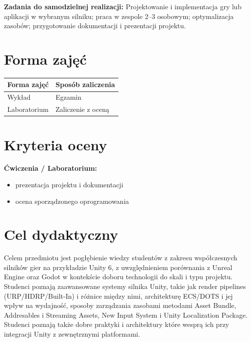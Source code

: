 \documentclass[12pt, a4paper]{article}
\newcommand{\thdrule}{\noalign{\global\setlength{\extrarowheight}{0pt}}}
\newcommand{\thdend}{\noalign{\global\setlength{\extrarowheight}{3pt}}}
\begin{document}
\vspace{4pt}
\noindent\textbf{Zadania do samodzielnej realizacji:} Projektowanie i implementacja gry lub aplikacji w wybranym silniku; praca w zespole 2–3 osobowym; optymalizacja zasobów; przygotowanie dokumentacji i prezentacji projektu.

\section{Forma zajęć}

\begin{center}
{\scriptsize
\begin{tabular}{m{5cm}m{8cm}}
\thdrule\toprule
\rowcolor{pjatkRed} {\color{white}\textbf{Forma zajęć}} & {\color{white}\textbf{Sposób zaliczenia}} \\
\midrule\thdend
  \rowcolor{tableRowLight} Wykład & Egzamin \\
  \rowcolor{tableRowAlt} Laboratorium & Zaliczenie z oceną \\
\bottomrule
\end{tabular}}
\end{center}

\section{Kryteria oceny}

\textbf{Ćwiczenia / Laboratorium:}
\begin{itemize}
  \item prezentacja projektu i dokumentacji
  \item ocena sporządzonego oprogramowania
\end{itemize}


\section{Cel dydaktyczny}

Celem przedmiotu jest pogłębienie wiedzy studentów z zakresu współczesnych silników gier na przykładzie Unity 6, z uwzględnieniem porównania z Unreal Engine oraz Godot w kontekście doboru technologii do skali i typu projektu. Studenci poznają zaawansowane systemy silnika Unity, takie jak render pipelines (URP/HDRP/Built-In) i różnice między nimi, architekturę ECS/DOTS i jej wpływ na wydajność, sposoby zarządzania zasobami metodami Asset Bundle, Addresables i Streaming Assets, New Input System i Unity Localization Package. Studenci poznają także dobre praktyki i architektury które wesprą ich przy integracji Unity z zewnętrznymi platformami. 
\end{document}
